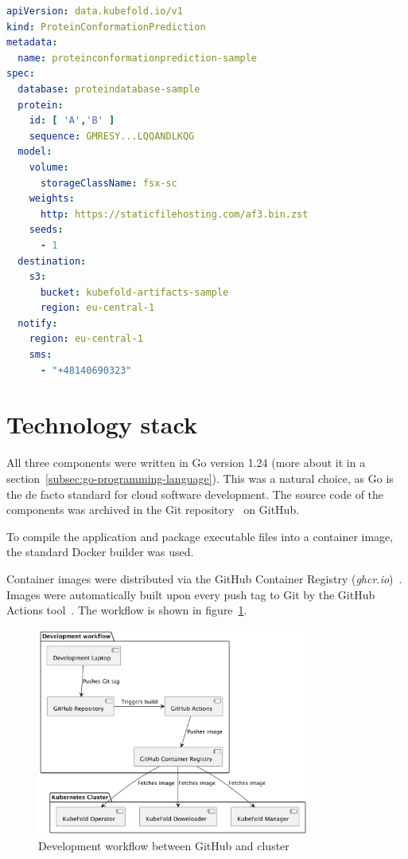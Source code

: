 \begin{lstlisting}[language=yaml,caption={Example \texttt{ProteinConformationPrediction} resource definition},label={lst:protein_conformation_prediction}]
apiVersion: data.kubefold.io/v1
kind: ProteinConformationPrediction
metadata:
  name: proteinconformationprediction-sample
spec:
  database: proteindatabase-sample
  protein:
    id: [ 'A','B' ]
    sequence: GMRESY...LQQANDLKQG
  model:
    volume:
      storageClassName: fsx-sc
    weights:
      http: https://staticfilehosting.com/af3.bin.zst
    seeds:
      - 1
  destination:
    s3:
      bucket: kubefold-artifacts-sample
      region: eu-central-1
  notify:
    region: eu-central-1
    sms:
      - "+48140690323"
\end{lstlisting}


\section{Technology stack}
All three components were written in Go version 1.24 (more about it in a section~\ref{subsec:go-programming-language}).
This was a natural choice, as Go is the de facto standard for cloud software development.
The source code of the components was archived in the Git repository~\cite{git} on GitHub\cite{github}.

To compile the application and package executable files into a container image, the standard Docker builder was used.

Container images were distributed via the GitHub Container Registry (\textit{ghcr.io})~\cite{ghcr}.
Images were automatically built upon every push tag to Git by the GitHub Actions tool~\cite{github_actions}.
The workflow is shown in figure~\ref{fig:docker-images-flow}.

\begin{figure}[htbp]
    \centering
    \includegraphics[width=0.8\textwidth]{images/images}
    \caption{Development workflow between GitHub and cluster}
    \label{fig:docker-images-flow}
\end{figure}

